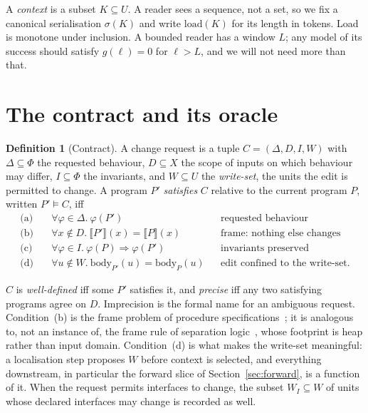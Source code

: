 \documentclass[10pt]{article}
\theoremstyle{definition}
\newtheorem{definition}{Definition}
\theoremstyle{plain}
\theoremstyle{remark}
\newcommand{\sem}[1]{\llbracket #1 \rrbracket}
\begin{document}
A \emph{context} is a subset $K \subseteq U$. A reader sees a sequence, not a set, so we fix a canonical serialisation $\sigma(K)$ and write $\mathrm{load}(K)$ for its length in tokens. Load is monotone under inclusion. A bounded reader has a window $L$; any model of its success should satisfy $g(\ell) = 0$ for $\ell > L$, and we will not need more than that.

\section{The contract and its oracle}

\begin{definition}[Contract]
A change request is a tuple $C = (\Delta, D, I, W)$ with $\Delta \subseteq \Phi$ the requested behaviour, $D \subseteq X$ the scope of inputs on which behaviour may differ, $I \subseteq \Phi$ the invariants, and $W \subseteq U$ the \emph{write-set}, the units the edit is permitted to change. A program $P'$ \emph{satisfies} $C$ relative to the current program $P$, written $P' \models C$, iff
\begin{align*}
\text{(a)}\quad & \forall \varphi \in \Delta.\ \varphi(P') && \text{requested behaviour}\\
\text{(b)}\quad & \forall x \notin D.\ \sem{P'}(x) = \sem{P}(x) && \text{frame: nothing else changes}\\
\text{(c)}\quad & \forall \varphi \in I.\ \varphi(P) \Rightarrow \varphi(P') && \text{invariants preserved}\\
\text{(d)}\quad & \forall u \notin W.\ \mathrm{body}_{P'}(u) = \mathrm{body}_P(u) && \text{edit confined to the write-set.}
\end{align*}
\end{definition}

$C$ is \emph{well-defined} iff some $P'$ satisfies it, and \emph{precise} iff any two satisfying programs agree on $D$. Imprecision is the formal name for an ambiguous request. Condition~(b) is the frame problem of procedure specifications~\cite{borgida1995frame}; it is analogous to, not an instance of, the frame rule of separation logic~\cite{ohearn2001local}, whose footprint is heap rather than input domain. Condition~(d) is what makes the write-set meaningful: a localisation step proposes $W$ before context is selected, and everything downstream, in particular the forward slice of Section~\ref{sec:forward}, is a function of it. When the request permits interfaces to change, the subset $W_I \subseteq W$ of units whose declared interfaces may change is recorded as well.
\end{document}
